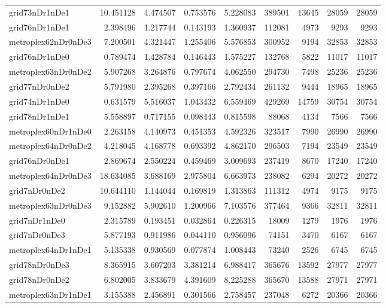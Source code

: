 \begin{longtable}{|l|r|r|r|r|r|r|r|r|}
grid73nDr1nDe1 & 10.451128 & 4.474507 & 0.753576 & 5.228083 & 389501 & 13645 & 28059 & 28059 \\
grid76nDr1nDe1 & 2.398496 & 1.217744 & 0.143193 & 1.360937 & 112081 & 4973 & 9293 & 9293 \\
metroplex62nDr0nDe3 & 7.200501 & 4.321447 & 1.255406 & 5.576853 & 300952 & 9194 & 32853 & 32853 \\
grid76nDr1nDe0 & 0.789474 & 1.428784 & 0.146443 & 1.575227 & 132768 & 5822 & 11017 & 11017 \\
metroplex63nDr0nDe2 & 5.907268 & 3.264876 & 0.797674 & 4.062550 & 294730 & 7498 & 25236 & 25236 \\
grid77nDr0nDe2 & 5.791980 & 2.395268 & 0.397166 & 2.792434 & 261132 & 9444 & 18965 & 18965 \\
grid74nDr1nDe0 & 0.631579 & 5.516037 & 1.043432 & 6.559469 & 429269 & 14759 & 30754 & 30754 \\
grid78nDr1nDe1 & 5.558897 & 0.717155 & 0.098443 & 0.815598 & 88068 & 4134 & 7566 & 7566 \\
metroplex60nDr1nDe0 & 2.263158 & 4.140973 & 0.451353 & 4.592326 & 323517 & 7990 & 26990 & 26990 \\
metroplex64nDr0nDe2 & 4.218045 & 4.168778 & 0.693392 & 4.862170 & 296503 & 7194 & 23549 & 23549 \\
grid76nDr0nDe1 & 2.869674 & 2.550224 & 0.459469 & 3.009693 & 237419 & 8670 & 17240 & 17240 \\
metroplex64nDr0nDe3 & 18.634085 & 3.688169 & 2.975804 & 6.663973 & 238082 & 6294 & 20272 & 20272 \\
grid7nDr0nDe2 & 10.644110 & 1.144044 & 0.169819 & 1.313863 & 111312 & 4974 & 9175 & 9175 \\
metroplex63nDr0nDe3 & 9.152882 & 5.902610 & 1.200966 & 7.103576 & 377464 & 9366 & 32811 & 32811 \\
grid7nDr1nDe0 & 2.315789 & 0.193451 & 0.032864 & 0.226315 & 18009 & 1279 & 1976 & 1976 \\
grid7nDr0nDe3 & 5.877193 & 0.911986 & 0.044110 & 0.956096 & 74151 & 3470 & 6167 & 6167 \\
metroplex64nDr1nDe1 & 5.135338 & 0.930569 & 0.077874 & 1.008443 & 73240 & 2526 & 6745 & 6745 \\
grid78nDr0nDe3 & 8.365915 & 3.607203 & 3.381214 & 6.988417 & 365676 & 13592 & 27977 & 27977 \\
grid78nDr0nDe2 & 6.802005 & 3.833679 & 4.391609 & 8.225288 & 365670 & 13588 & 27971 & 27971 \\
metroplex63nDr1nDe1 & 3.155388 & 2.456891 & 0.301566 & 2.758457 & 237048 & 6272 & 20366 & 20366 \\

\end{longtable}
